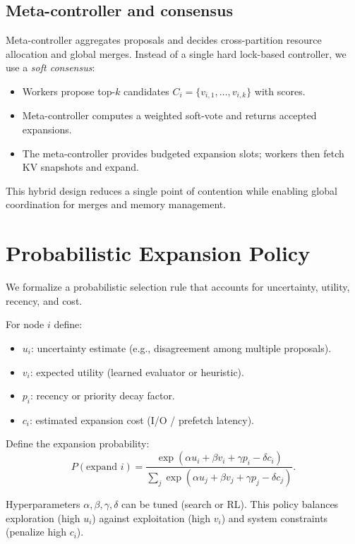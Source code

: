 \documentclass[11pt,onecolumn,letterpaper]{article}
\begin{document}
\subsection{Meta-controller and consensus}
Meta-controller aggregates proposals and decides cross-partition resource allocation and global merges. Instead of a single hard lock-based controller, we use a \emph{soft consensus}:
\begin{itemize}[nosep]
  \item Workers propose top-\(k\) candidates \(C_i=\{v_{i,1},\ldots,v_{i,k}\}\) with scores.
  \item Meta-controller computes a weighted soft-vote and returns accepted expansions.
  \item The meta-controller provides budgeted expansion slots; workers then fetch KV snapshots and expand.
\end{itemize}

This hybrid design reduces a single point of contention while enabling global coordination for merges and memory management.

\section{Probabilistic Expansion Policy}
We formalize a probabilistic selection rule that accounts for uncertainty, utility, recency, and cost.

For node \(i\) define:
\begin{itemize}[nosep]
  \item \(u_i\): uncertainty estimate (e.g., disagreement among multiple proposals).
  \item \(v_i\): expected utility (learned evaluator or heuristic).
  \item \(p_i\): recency or priority decay factor.
  \item \(c_i\): estimated expansion cost (I/O / prefetch latency).
\end{itemize}

Define the expansion probability:
\begin{equation}\label{eq:prob}
P(\text{expand } i) = \frac{\exp(\alpha u_i + \beta v_i + \gamma p_i - \delta c_i)}{\sum_j \exp(\alpha u_j + \beta v_j + \gamma p_j - \delta c_j)}.
\end{equation}

Hyperparameters \(\alpha,\beta,\gamma,\delta\) can be tuned (search or RL). This policy balances exploration (high \(u_i\)) against exploitation (high \(v_i\)) and system constraints (penalize high \(c_i\)).
\end{document}
